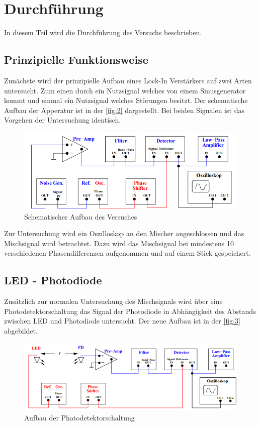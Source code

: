 \newpage
\section{Durchführung}
In diesem Teil wird die Durchführung des Versuchs beschrieben.

\subsection{Prinzipielle Funktionsweise}
Zunächste wird der prinzipielle Aufbau eines Lock-In Verstärkers auf zwei Arten untersucht. Zum einen durch ein Nutzsignal welches von einem Sinusgenerator kommt und einmal ein Nutzsignal welches Störungen besitzt. Der schematische Aufbau der Apperatur ist in der \autoref{fig:2} dargestellt. Bei beiden Signalen ist das Vorgehen der Untersuchung identisch.

\begin{figure}[H]
    \centering
    \includegraphics{Picture/2.png}
    \caption{Schematischer Aufbau des Versuches %
    }
    \label{fig:2}
\end{figure}

\noindent
Zur Untersuchung wird ein Oszilloskop an den Mischer angeschlossen und das Mischsignal wird betrachtet. Dazu wird das Mischsignal bei mindestens 10 verschiedenen Phasendifferenzen aufgenommen und auf einem Stick gespeichert.

\newpage
\subsection{LED - Photodiode}
Zusätzlich zur normalen Untersuchung des Mischsignals wird über eine Photodetektorschaltung das Signal der Photodiode in Abhängigkeit des Abstands zwischen LED und Photodiode untersucht. Der neue Aufbau ist in der \autoref{fig:3} abgebildet.

\begin{figure}[H]
    \centering
    \includegraphics{Picture/3.png}
    \caption{Aufbau der Photodetektorschaltung %
    }
    \label{fig:3}
\end{figure}
\noindent